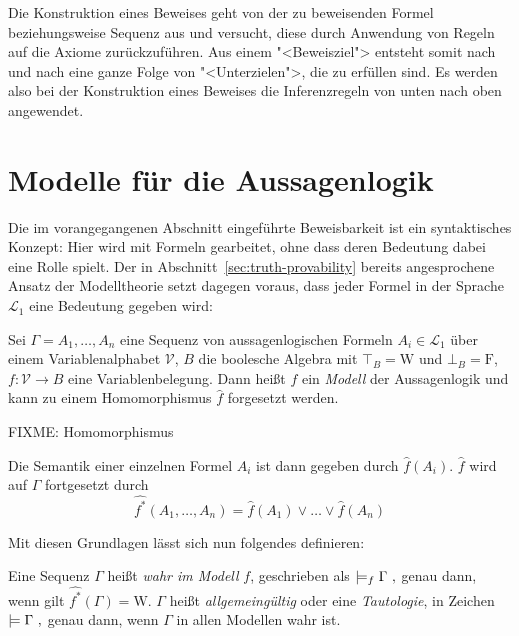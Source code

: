 Die Konstruktion eines Beweises geht
von der zu beweisenden Formel beziehungsweise Sequenz aus und
versucht, diese durch Anwendung von Regeln auf die Axiome zurückzuführen.  Aus
einem "<Beweisziel"> entsteht somit nach und nach eine ganze Folge von
"<Unterzielen">, die zu erfüllen sind.  Es werden also bei der Konstruktion eines
Beweises die Inferenzregeln von unten nach
oben angewendet.

\section{Modelle für die Aussagenlogik}
\label{sec:models}

Die im vorangegangenen Abschnitt eingeführte Beweisbarkeit ist ein
syntaktisches Konzept: Hier wird mit Formeln gearbeitet, ohne dass deren
Bedeutung dabei eine Rolle spielt.  Der in
Abschnitt~\ref{sec:truth-provability} bereits angesprochene Ansatz der
Modelltheorie setzt dagegen voraus, dass jeder
Formel in der Sprache $\mathcal{L}_1$ eine Bedeutung gegeben wird:  

\begin{definition}
  Sei $\Gamma=A_1,\ldots,A_n$ eine Sequenz von aussagenlogischen Formeln $A_i\in
  \mathcal{L}_1$ über einem Variablenalphabet
  $\mathcal{V}$, $B$ die boolesche Algebra mit $\top_B=\mathrm{W}$ und $\bot_B=\mathrm{F}$, $f:\mathcal{V}\rightarrow 
  B$ eine Variablenbelegung.  Dann heißt $f$ ein \emph{Modell} der
  Aussagenlogik und kann zu einem
  Homomorphismus $\hat{f}$ forgesetzt werden.

  FIXME: Homomorphismus

  Die Semantik einer einzelnen Formel $A_i$ ist dann gegeben
  durch $\hat{f}(A_i)$.  $\hat{f}$ wird auf $\Gamma$
  fortgesetzt durch
  \[ \widehat{\mbox{$f$}^*}(A_1,\dots,A_n) = \hat{f}(A_1)\vee\dots\vee\hat{f}(A_n)\]
\end{definition}

Mit diesen Grundlagen lässt sich nun folgendes definieren:

\begin{definition}
  Eine Sequenz $\Gamma$ heißt \emph{wahr im Modell} $f$, geschrieben
  als
%
\(
  \models_f \Gamma\ ,\index{*@$\models_f$}
\)
genau dann, wenn gilt
\(\widehat{\mbox{$f$}^*}(\Gamma) = \mathrm{W}\).
%
$\Gamma$ heißt \emph{allgemeingültig} oder eine \emph{Tautologie}, in Zeichen
%
\(
  \models \Gamma\ ,\index{*@$\models$}
\)
%
genau dann, wenn $\Gamma$ in allen Modellen wahr ist.

\end{definition}

